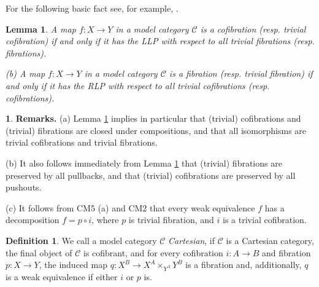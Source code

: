 \documentclass[12pt]{amsart}
\theoremstyle{plain}
\newtheorem{Lem}[Thm]{Lemma}
\theoremstyle{definition}
\newtheorem{Def}[Thm]{Definition}
\newtheorem{Emp}[Thm]{}
\numberwithin{equation}{section}
\newcommand{\cal}[1]{\mathcal{#1}}
\newcommand{\C}[1]{\cal#1}
\newcommand{\rl}[1]{Lemma \ref{L:#1}}
\begin{document}
For the following basic fact see, for example, \cite[II, Lem.
1.1]{GJ}.

\begin{Lem} \label{L:modcat}
A map $f:X\to Y$ in a model category ${\C{C}}$ is a cofibration
(resp. trivial cofibration) if and only if it has the LLP with
respect to all trivial fibrations (resp. fibrations).

(b) A map $f:X\to Y$ in a model category ${\C{C}}$ is a fibration
(resp. trivial fibration) if and only if it has the RLP with
respect to all trivial cofibrations (resp. cofibrations).
\end{Lem}

\begin{Emp} \label{E:remmodcat}
{\bf Remarks.} (a) \rl{modcat} implies in particular that
(trivial) cofibrations and (trivial) fibrations are closed under
compositions, and that all isomorphisms are trivial cofibrations and trivial 
fibrations.

(b) It also follows immediately from \rl{modcat} that (trivial)
fibrations are preserved by all pullbacks, and that (trivial)
cofibrations are preserved by all pushouts.

(c) It follows from CM5 (a) and CM2 that every weak equivalence
$f$ has a decomposition $f=p\circ i$, where $p$ is trivial
fibration, and $i$ is a trivial cofibration.
\end{Emp}


\begin{Def} \label{D:Cart}
We call a model category ${\C{C}}$ {\em Cartesian}, if ${\C{C}}$
is a Cartesian category, the final object of ${\C{C}}$ is
cofibrant, and for every cofibration $i:A\to B$ and fibration
$p:X\to Y$, the induced map $q:X^B\to X^A\times_{Y^A} Y^B$ is a
fibration and, additionally, $q$ is a weak equivalence if either
$i$ or $p$ is.
\end{Def}
\end{document}
